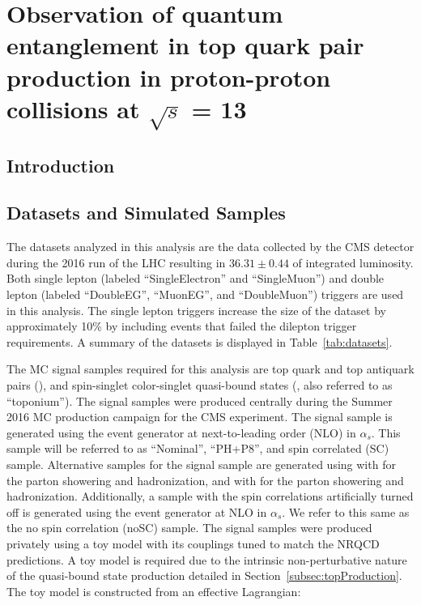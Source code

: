 
\chapter{Observation of quantum entanglement in top quark pair production in proton-proton collisions at $\sqrt{s}$ = 13 \TeV}
\label{ch:Entanglement2016}

\section{Introduction}

\section{Datasets and Simulated Samples}
\label{sec:datasets}

The datasets analyzed in this analysis are the data collected by the CMS detector during the 2016 run of the LHC resulting in $36.31 \pm 0.44$ \invfb of integrated luminosity. Both single lepton (labeled ``SingleElectron'' and ``SingleMuon'') and double lepton (labeled ``DoubleEG'', ``MuonEG'', and ``DoubleMuon'') triggers are used in this analysis. The single lepton triggers increase the size of the dataset by approximately 10\% by including events that failed the dilepton trigger requirements. A summary of the datasets is displayed in Table~\ref{tab:datasets}.

The MC signal samples required for this analysis are top quark and top antiquark pairs (\ttbar), and spin-singlet color-singlet quasi-bound states (\etat, also referred to as ``toponium''). The \ttbar signal samples were produced centrally during the Summer 2016 MC production campaign for the CMS experiment. The \ttbar signal sample is generated using the \Powheg event generator at next-to-leading order (NLO) in $\alpha_s$. This \ttbar sample will be referred to as ``Nominal'', ``PH+P8'', and spin correlated (SC) sample. Alternative samples for the \ttbar signal sample are generated using \MGaMCatNLO with \Pythia for the parton showering and hadronization, and \Powheg with \Herwig for the parton showering and hadronization. Additionally, a \ttbar sample with the spin correlations artificially turned off is generated using the \Powheg event generator at NLO in $\alpha_s$. We refer to this same as the no spin correlation (noSC) sample. The \etat signal samples were produced privately using a toy model with its couplings tuned to match the NRQCD predictions. A toy model is required due to the intrinsic non-perturbative nature of the quasi-bound state production detailed in Section~\ref{subsec:topProduction}. The toy model is constructed from an effective Lagrangian:

